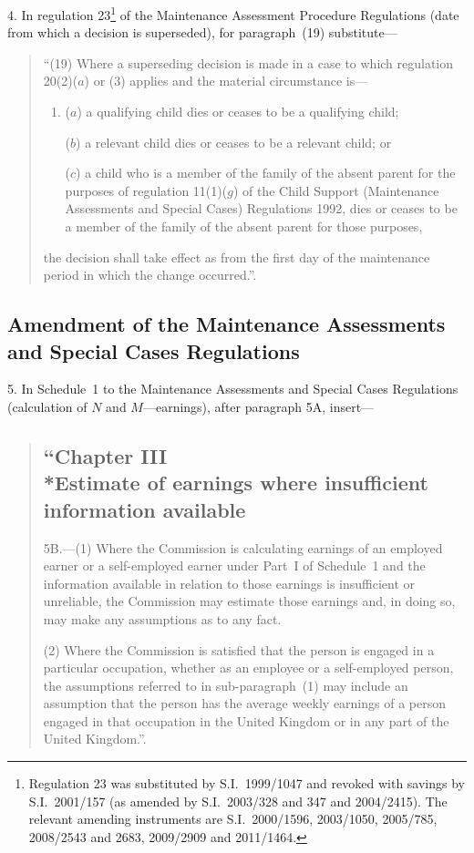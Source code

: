 \documentclass[12pt,a4paper]{article}
\begin{document}
4.  In regulation 23\footnote{Regulation 23 was substituted by S.I.~1999/1047 and revoked with savings by S.I.~2001/157 (as amended by S.I.~2003/328 and 347 and 2004/2415). The relevant amending instruments are S.I.~2000/1596, 2003/1050, 2005/785, 2008/2543 and 2683, 2009/2909 and 2011/1464.} of the Maintenance Assessment Procedure Regulations (date from which a decision is superseded), for paragraph~(19) substitute—
\begin{quotation}
“(19) Where a superseding decision is made in a case to which regulation 20(2)($a$)  or (3) applies and the material circumstance is---
\begin{enumerate}\item[]
($a$) a qualifying child dies or ceases to be a qualifying child;

($b$) a relevant child dies or ceases to be a relevant child; or

($c$) a child who is a member of the family of the absent parent for the purposes of regulation 11(1)($g$)  of the Child Support (Maintenance Assessments and Special Cases) Regulations 1992, dies or ceases to be a member of the family of the absent parent for those purposes,
\end{enumerate}
the decision shall take effect as from the first day of the maintenance period in which the change occurred.”.
\end{quotation}

\subsection[5. Amendment of the Maintenance Assessments and Special Cases Regulations]{Amendment of the Maintenance Assessments and Special Cases Regulations}

5.  In Schedule~1 to the Maintenance Assessments and Special Cases Regulations (calculation of $N$ and $M$---earnings), after paragraph 5A, insert—
\begin{quotation}
\subsection*{“Chapter III\\*Estimate of earnings where insufficient information available}

5B.---(1)  Where the Commission is calculating earnings of an employed earner or a self-employed earner under Part~I of Schedule~1 and the information available in relation to those earnings is insufficient or unreliable, the Commission may estimate those earnings and, in doing so, may make any assumptions as to any fact.

(2) Where the Commission is satisfied that the person is engaged in a particular occupation, whether as an employee or a self-employed person, the assumptions referred to in sub-paragraph~(1) may include an assumption that the person has the average weekly earnings of a person engaged in that occupation in the United Kingdom or in any part of the United Kingdom.”.
\end{quotation}
\end{document}
